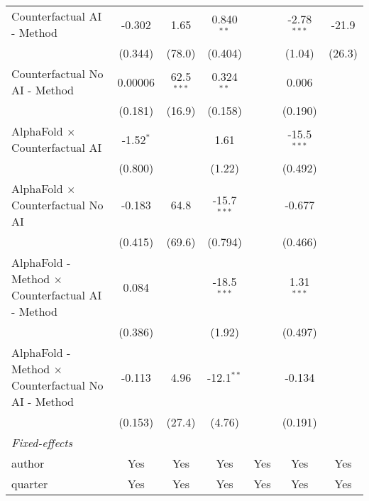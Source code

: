 \begin{tabular}{lcccccc}
   Counterfactual AI - Method                                 & -0.302      & 1.65         & 0.840$^{**}$  &       & -2.78$^{***}$ & -21.9\\   
                                                              & (0.344)     & (78.0)       & (0.404)       &       & (1.04)        & (26.3)\\   
   Counterfactual No AI - Method                              & 0.00006     & 62.5$^{***}$ & 0.324$^{**}$  &       & 0.006         &   \\   
                                                              & (0.181)     & (16.9)       & (0.158)       &       & (0.190)       &   \\   
   AlphaFold $\times$ Counterfactual AI                       & -1.52$^{*}$ &              & 1.61          &       & -15.5$^{***}$ &   \\   
                                                              & (0.800)     &              & (1.22)        &       & (0.492)       &   \\   
   AlphaFold $\times$ Counterfactual No AI                    & -0.183      & 64.8         & -15.7$^{***}$ &       & -0.677        &   \\   
                                                              & (0.415)     & (69.6)       & (0.794)       &       & (0.466)       &   \\   
   AlphaFold - Method $\times$ Counterfactual AI - Method     & 0.084       &              & -18.5$^{***}$ &       & 1.31$^{***}$  &   \\   
                                                              & (0.386)     &              & (1.92)        &       & (0.497)       &   \\   
   AlphaFold - Method $\times$ Counterfactual No AI - Method  & -0.113      & 4.96         & -12.1$^{**}$  &       & -0.134        &   \\   
                                                              & (0.153)     & (27.4)       & (4.76)        &       & (0.191)       &   \\   
   \midrule
   \emph{Fixed-effects}\\
   author                                                     & Yes         & Yes          & Yes           & Yes   & Yes           & Yes\\  
   quarter                                                    & Yes         & Yes          & Yes           & Yes   & Yes           & Yes\\  

\end{tabular}
